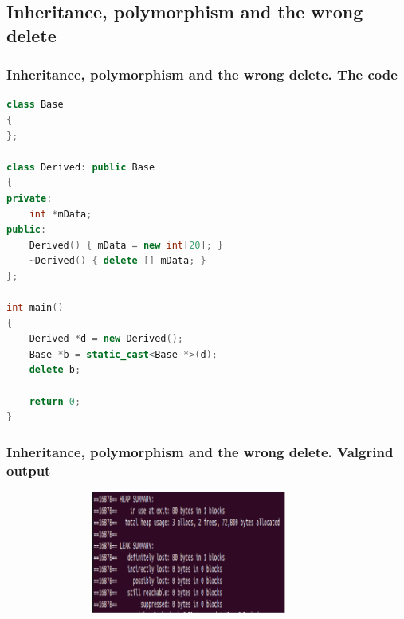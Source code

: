 \documentclass[10pt,xcolor={usenames,dvipsnames}]{beamer}
\begin{document}
\subsection{Inheritance, polymorphism and the wrong delete}


\begin{frame}[fragile]
\frametitle{Inheritance, polymorphism and the wrong delete. The code} 
	\begin{center}
		\begin{lstlisting}[language=C++]
class Base
{
};

class Derived: public Base
{
private:
	int *mData;
public:
	Derived() { mData = new int[20]; }
	~Derived() { delete [] mData; }
};

int main()
{
	Derived *d = new Derived();
	Base *b = static_cast<Base *>(d);
	delete b;

	return 0;
}
		\end{lstlisting}
	\end{center}
\end{frame}

\begin{frame}[fragile]
	\frametitle{Inheritance, polymorphism and the wrong delete. Valgrind output}
	\begin{center}
		\begin{figure}
			\includegraphics[height=4cm,width=10cm]{virtual_destructor.png}
		\end{figure}
	\end{center}
\end{frame}
\end{document}
